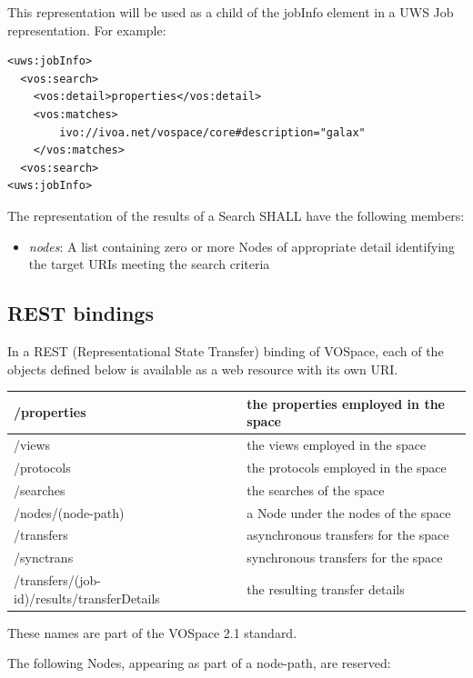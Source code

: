 \documentclass[11pt,a4paper]{ivoa}
\begin{document}
This representation will be used as a child of the jobInfo element in a UWS Job representation. For example:

\begin{verbatim}
<uws:jobInfo>
  <vos:search>
    <vos:detail>properties</vos:detail>
    <vos:matches>
        ivo://ivoa.net/vospace/core#description="galax"
    </vos:matches>
  <vos:search>
<uws:jobInfo>
\end{verbatim}

The representation of the results of a Search SHALL have the following members:

\begin{itemize}
    \item \emph{nodes}: A list containing zero or more Nodes of appropriate detail identifying the target URIs meeting the search criteria
\end{itemize}

\subsection{REST bindings}
\label{subsec:rest bindings}
In a REST (Representational State Transfer) binding of VOSpace, each of the objects defined below is available as a web resource with its own URI.

\vspace{3mm}
\begin{tabular}{ l p{4cm} }
    \hline
    /properties & the properties employed in the space \\
    \hline
    /views & the views employed in the space \\
    \hline
    /protocols & the protocols employed in the space \\
    \hline
    /searches & the searches of the space \\
    \hline
    /nodes/(node-path) & a Node under the nodes of the space \\
    \hline
    /transfers & asynchronous transfers for the space \\
    \hline
    /synctrans & synchronous transfers for the space \\
    \hline
    /transfers/(job-id)/results/transferDetails & the resulting transfer details \\
    \hline
\end{tabular}
\vspace{3mm}

These names are part of the VOSpace 2.1 standard.

The following Nodes, appearing as part of a node-path, are reserved:
\end{document}
